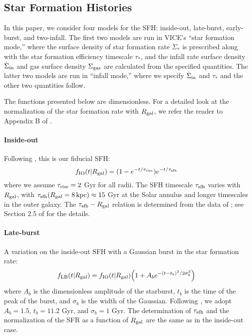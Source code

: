 \documentclass[twocolumn,linenumbers,twocolappendix]{aastex631}
\begin{document}
\subsection{Star Formation Histories}
\label{sec:sfh}

In this paper, we consider four models for the SFH: inside-out, late-burst, early-burst, and two-infall. The first two models are run in VICE's ``star formation mode,'' where the surface density of star formation rate $\dot\Sigma_*$ is prescribed along with the star formation efficiency timescale $\tau_*$, and the infall rate surface density $\dot\Sigma_{\rm in}$ and gas surface density $\Sigma_{\rm gas}$ are calculated from the specified quantities. The latter two models are run in ``infall mode,'' where we specify $\dot\Sigma_{\rm in}$  and $\tau_*$ and the other two quantities follow. 

The functions presented below are dimensionless. For a detailed look at the normalization of the star formation rate with $R_{\rm gal}$, we refer the reader to Appendix B of \citet{Johnson2021-Migration}.

\paragraph{Inside-out} Following \citet{Johnson2021-Migration}, this is our fiducial SFH:
\begin{equation}
    f_{\rm IO}(t|R_{\rm gal}) = (1 - e^{-t/\tau_{\rm rise}}) e^{-t/\tau_{\rm sfh}}
    \label{eq:insideout-sfh}
\end{equation}
where we assume $\tau_{\rm rise}=2$ Gyr for all radii. The SFH timescale $\tau_{\rm sfh}$ varies with $R_{\rm gal}$, with $\tau_{\rm sfh}(R_{\rm gal}=8\,\rm{kpc})\approx15$ Gyr at the Solar annulus and longer timescales in the outer galaxy. The $\tau_{\rm sfh} - R_{\rm gal}$ relation is determined from the data of \citet{Sanchez2020-StarFormationTimescales}; see Section 2.5 of \citet{Johnson2021-Migration} for the details.

\paragraph{Late-burst} A variation on the inside-out SFH with a Gaussian burst in the star formation rate:
\begin{equation}
    f_{\rm LB}(t|R_{\rm gal}) = f_{\rm IO}(t|R_{\rm gal}) \Big(1 + A_b e^{-(t-t_b)^2/2\sigma_b^2} \Big)
    \label{eq:lateburst-sfh}
\end{equation}
where $A_b$ is the dimensionless amplitude of the starburst, $t_b$ is the time of the peak of the burst, and $\sigma_b$ is the width of the Gaussian. Following \citet{Johnson2021-Migration}, we adopt $A_b=1.5$, $t_b=11.2$ Gyr, and $\sigma_b=1$ Gyr. The determination of $\tau_{\rm sfh}$ and the normalization of the SFR as a function of $R_{\rm gal}$ are the same as in the inside-out case.
\end{document}

